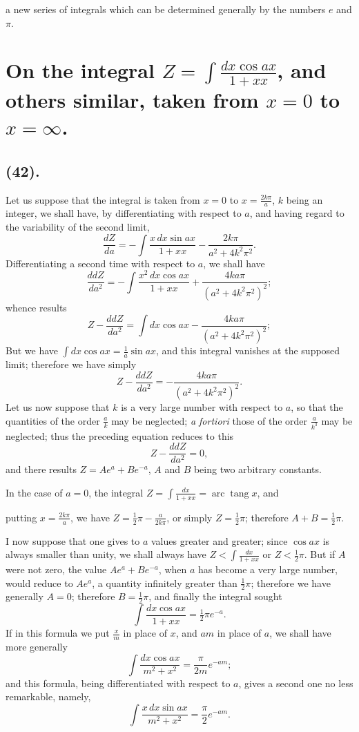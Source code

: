 \documentclass{article}
\begin{document}
a new series of integrals which can be determined generally by the numbers $e$ and $\pi$.

\section*{On the integral $Z=\displaystyle\int\frac{dx\cos ax}{1+xx}$, and others similar, taken from $x=0$ to $x=\infty$.}

\subsection*{(42).}

Let us suppose that the integral is taken from $x=0$ to $x=\frac{2k\pi}{a}$, $k$ being an integer, we shall have, by differentiating with respect to $a$, and having regard to the variability of the second limit,
\[ \frac{dZ}{da}=-\int\frac{x\,dx\sin ax}{1+xx}-\frac{2k\pi}{a^{2}+4k^{2}\pi^{2}}. \]
Differentiating a second time with respect to $a$, we shall have
\[ \frac{ddZ}{da^{2}}=-\int\frac{x^{2}\,dx\cos ax}{1+xx}+\frac{4ka\pi}{(a^{2}+4k^{2}\pi^{2})^{2}}; \]
whence results
\[ Z-\frac{ddZ}{da^{2}}=\int dx\cos ax-\frac{4ka\pi}{(a^{2}+4k^{2}\pi^{2})^{2}}; \]
But we have $\displaystyle\int dx\cos ax=\frac{1}{a}\sin ax$, and this integral vanishes at the supposed limit; therefore we have simply
\[ Z-\frac{ddZ}{da^{2}}=-\frac{4ka\pi}{(a^{2}+4k^{2}\pi^{2})^{2}}. \]
Let us now suppose that $k$ is a very large number with respect to $a$, so that the quantities of the order $\frac{a}{k}$ may be neglected; \emph{a fortiori} those of the order $\frac{a}{k^{3}}$ may be neglected; thus the preceding equation reduces to this
\[ Z-\frac{ddZ}{da^{2}}=0, \]
and there results $Z=Ae^{a}+Be^{-a}$, $A$ and $B$ being two arbitrary constants.

In the case of $a=0$, the integral $Z=\displaystyle\int\frac{dx}{1+xx}=\operatorname{arc}\operatorname{tang}x$, and

putting $x=\frac{2k\pi}{a}$, we have $Z=\frac{1}{2}\pi-\frac{a}{2k\pi}$, or simply $Z=\frac{1}{2}\pi$; therefore $A+B=\frac{1}{2}\pi$.

I now suppose that one gives to $a$ values greater and greater; since $\cos ax$ is always smaller than unity, we shall always have $Z<\displaystyle\int\frac{dx}{1+xx}$ or $Z<\frac{1}{2}\pi$. But if $A$ were not zero, the value $Ae^{a}+Be^{-a}$, when $a$ has become a very large number, would reduce to $Ae^{a}$, a quantity infinitely greater than $\frac{1}{2}\pi$; therefore we have generally $A=0$; therefore $B=\frac{1}{2}\pi$, and finally the integral sought
\[ \int\frac{dx\cos ax}{1+xx}=\tfrac{1}{2}\pi e^{-a}. \]
If in this formula we put $\frac{x}{m}$ in place of $x$, and $am$ in place of $a$, we shall have more generally
\[ \int\frac{dx\cos ax}{m^{2}+x^{2}}=\frac{\pi}{2m}e^{-am}; \tag{1} \]
and this formula, being differentiated with respect to $a$, gives a second one no less remarkable, namely,
\[ \int\frac{x\,dx\sin ax}{m^{2}+x^{2}}=\frac{\pi}{2}e^{-am}. \tag{2} \]
\end{document}
